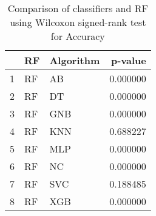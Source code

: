 \begin{table}
\footnotesize
\caption{Comparison of classifiers and RF using Wilcoxon signed-rank test for Accuracy}
\label{tab:RF wilcoxon Accuracy comparison}
\begin{tabular}{lllr}
\hline
 & RF & Algorithm & p-value \\
\hline
1 & RF & AB & 0.000000 \\
2 & RF & DT & 0.000000 \\
3 & RF & GNB & 0.000000 \\
4 & RF & KNN & 0.688227 \\
5 & RF & MLP & 0.000000 \\
6 & RF & NC & 0.000000 \\
7 & RF & SVC & 0.188485 \\
8 & RF & XGB & 0.000000 \\
\hline
\end{tabular}
\end{table}
